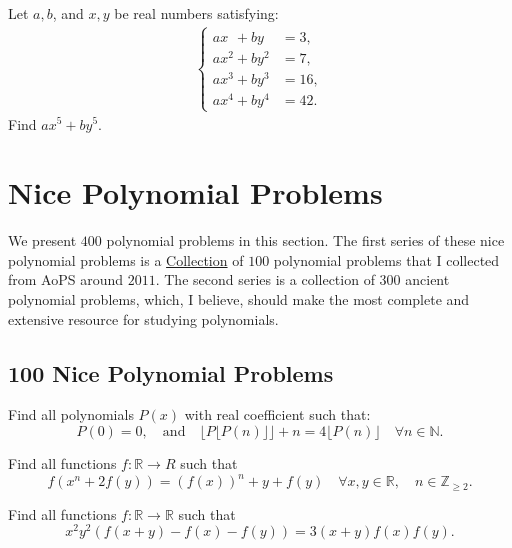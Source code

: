 \documentclass[12pt,a4paper]{memoir}
\theoremstyle{definition}
\begin{document}
\begin{question}[name={2016 Ecuador}]
	Let $a,b$, and $x,y$ be real numbers satisfying:
	\begin{align*}
		\begin{cases}
			ax\phantom{^1} + by\phantom{^1} &= 3,\\
			ax^2 + by^2 &= 7,\\
			ax^3 + by^3 &= 16,\\
			ax^4 + by^4 &= 42.
		\end{cases}
	\end{align*}
	Find $ax^5+by^5$.
\end{question}


\newpage
% 
\section{Nice Polynomial Problems}

We present $400$ polynomial problems in this section. The first series of these nice polynomial problems is a \href{https://artofproblemsolving.com/community/c6h397768p2212439}{Collection} of $100$ polynomial problems that I collected from AoPS around $2011$. The second series is a collection of $300$ ancient polynomial problems, which, I believe, should make the most complete and extensive resource for studying polynomials.

\subsection{100 Nice Polynomial Problems}



\begin{question}
	Find all polynomials $P(x)$ with real coefficient such that:
	\[P(0)=0 , \quad \text{and} \quad \lfloor P \lfloor P(n)\rfloor \rfloor +n=4\lfloor P(n) \rfloor \quad \forall n \in \mathbb N.\]
\end{question}

\begin{question}
	Find all functions $f: \mathbb R\to R$ such that
	\[f(x^n+2f(y))=(f(x))^n +y+f(y) \quad  \forall x, y \in \mathbb R, \quad  n \in \mathbb Z_{\geq 2}.\]
\end{question}

\begin{question}
	Find all functions $ f : \mathbb R\to \mathbb R$ such that
	\[ x^2y^2 \left( f(x+y)-f(x)-f(y) \right)=3(x+y)f(x)f(y).\]
\end{question}
\end{document}
